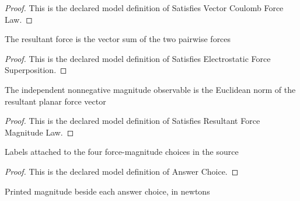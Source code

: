 \begin{proof}
  This is the declared model definition of Satisfies Vector Coulomb Force Law.
\end{proof}
\begin{definition}
  \label{def:physics:phyx-mini-0895:phyxminiproblems-problemphyxmini0895-satisfieselectrostaticforcesuperposition}
  The resultant force is the vector sum of the two pairwise forces
\end{definition}
\begin{proof}
  This is the declared model definition of Satisfies Electrostatic Force Superposition.
\end{proof}
\begin{definition}
  \label{def:physics:phyx-mini-0895:phyxminiproblems-problemphyxmini0895-satisfiesresultantforcemagnitudelaw}
  The independent nonnegative magnitude observable is the Euclidean norm of the resultant planar force vector
\end{definition}
\begin{proof}
  This is the declared model definition of Satisfies Resultant Force Magnitude Law.
\end{proof}
\begin{definition}
  \label{def:physics:phyx-mini-0895:phyxminiproblems-problemphyxmini0895-answerchoice}
  Labels attached to the four force-magnitude choices in the source
\end{definition}
\begin{proof}
  This is the declared model definition of Answer Choice.
\end{proof}
\begin{definition}
  \label{def:physics:phyx-mini-0895:phyxminiproblems-problemphyxmini0895-displayedforcemagnitudeinnewtons}
  Printed magnitude beside each answer choice, in newtons
\end{definition}
